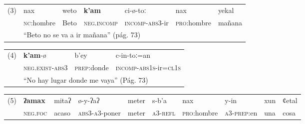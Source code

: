 {\begin{table}[H]
                  \begin{tabular}{rllllll}
                        \multicolumn{1}{l}{(3)} & nax                                                       & weto & \textbf{k'am}       & ci-ø-toː                & nax                 & yekal  \\
                                                & \textsc{nc}:hombre                                        & Beto & \textsc{neg.incomp} & \textsc{incomp-abs3}-ir & \textsc{pro}:hombre & mañana \\
                                                & \multicolumn{6}{l}{“Beto no se va a ir mañana” (pág. 73)}                                                                                       \\
                  \end{tabular}%
            \end{table}%
            \begin{table}[H]
                  \begin{tabular}{rlll}
                        \multicolumn{1}{l}{(4)} & \textbf{k'am}-ø                                            & b'ey                & c-in-toː=an                            \\
                                                & \textsc{neg.exist-abs3}                                    & \textsc{prep}:donde & \textsc{incomp-abs1s}-ir=\textsc{cl1s} \\
                                                & \multicolumn{3}{l}{“No hay lugar donde me vaya” (Pág. 73)}                                                                \\
                  \end{tabular}%
            \end{table}%
            \begin{table}[H]
                  \begin{tabular}{rlllllllll}
                        \multicolumn{1}{l}{(5)} & \textbf{ʔamax}                                                    & mitaʔ & ø-y-ʔaʔ                & meter & s-b'a            & nax                 & y-in                & xun & ȼetal \\
                                                & \textsc{neg.foc}                                                  & acaso & \textsc{abs3-a3}-poner & meter & \textsc{a3-refl} & \textsc{pro}:hombre & \textsc{a3-prep}:en & una & cosa  \\

\end{tabular}
\end{table}}
